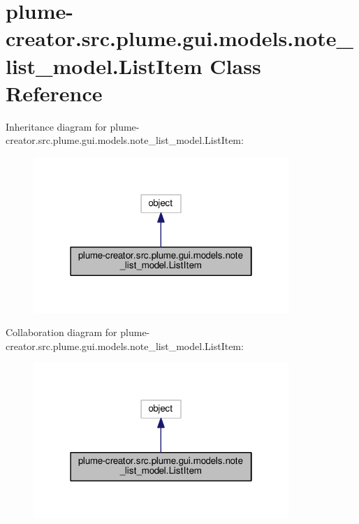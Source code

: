 \hypertarget{classplume-creator_1_1src_1_1plume_1_1gui_1_1models_1_1note__list__model_1_1_list_item}{}\section{plume-\/creator.src.\+plume.\+gui.\+models.\+note\+\_\+list\+\_\+model.\+List\+Item Class Reference}
\label{classplume-creator_1_1src_1_1plume_1_1gui_1_1models_1_1note__list__model_1_1_list_item}


Inheritance diagram for plume-\/creator.src.\+plume.\+gui.\+models.\+note\+\_\+list\+\_\+model.\+List\+Item\+:\nopagebreak
\begin{figure}[H]
\begin{center}
\leavevmode
\includegraphics[width=274pt]{classplume-creator_1_1src_1_1plume_1_1gui_1_1models_1_1note__list__model_1_1_list_item__inherit__graph}
\end{center}
\end{figure}


Collaboration diagram for plume-\/creator.src.\+plume.\+gui.\+models.\+note\+\_\+list\+\_\+model.\+List\+Item\+:\nopagebreak
\begin{figure}[H]
\begin{center}
\leavevmode
\includegraphics[width=274pt]{classplume-creator_1_1src_1_1plume_1_1gui_1_1models_1_1note__list__model_1_1_list_item__coll__graph}
\end{center}
\end{figure}
